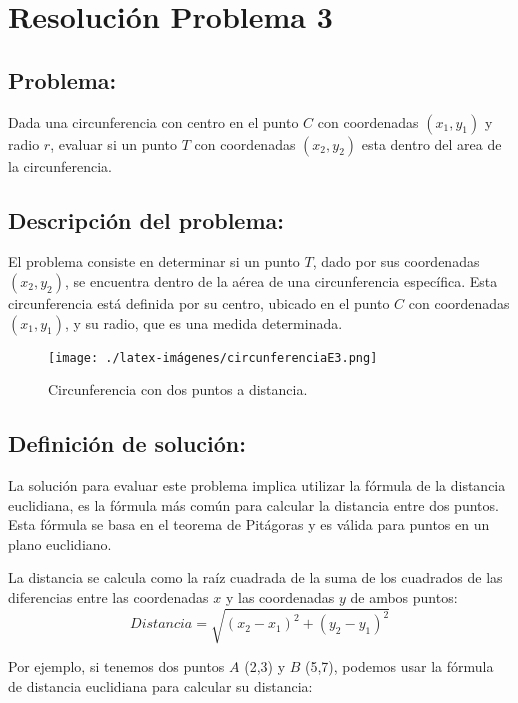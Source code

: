 \section{Resolución Problema 3}
\subsection{Problema:}
Dada una circunferencia con centro en el punto $C$ con coordenadas $(x_{1}, y_{1})$ y radio $r$, evaluar si un punto $T$ con coordenadas $(x_{2}, y_{2})$ esta dentro del area de la circunferencia.

\subsection{\textbf{Descripción del problema:}}

El problema consiste en determinar si un punto $T$, dado por sus coordenadas $(x_{2}, y_{2})$, se encuentra dentro de la aérea de una circunferencia específica. Esta circunferencia está definida por su centro, ubicado en el punto $C$ con coordenadas $(x_{1}, y_{1})$, y su radio, que es una medida determinada.

\begin{figure}[h!]
    \centering
    \texttt{[image: ./latex-imágenes/circunferenciaE3.png]}
    \caption{Circunferencia con dos puntos a distancia.}
    \label{fig:uno}
\end{figure}


\subsection{\textbf{Definición de solución:}}

La solución para evaluar este problema implica utilizar la fórmula de la distancia euclidiana, es la fórmula más común para calcular la distancia entre dos puntos. Esta fórmula se basa en el teorema de Pitágoras y es válida para puntos en un plano euclidiano.

La distancia se calcula como la raíz cuadrada de la suma de los cuadrados de las diferencias entre las coordenadas $x$ y las coordenadas $y$ de ambos puntos:
\begin{equation}
Distancia = 
   \sqrt{ (x_2 - x_1)^2 + (y_2 - y_1)^2 }     
\end{equation}

\par Por ejemplo, si tenemos dos puntos $A$ (2,3) y $B$ (5,7), podemos usar la fórmula de distancia euclidiana para calcular su distancia:\\

